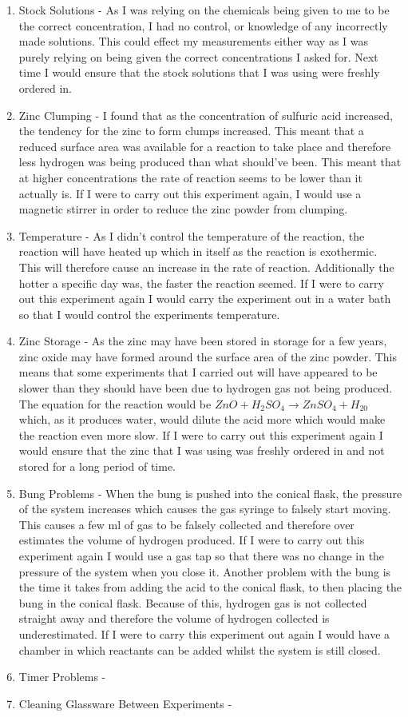 \begin{enumerate}
\item Stock Solutions - As I was relying on the chemicals being given to me to be the correct concentration, I had no control, or knowledge of any incorrectly made solutions. This could effect my measurements either way as I was purely relying on being given the correct concentrations I asked for. Next time I would ensure that the stock solutions that I was using were freshly ordered in.

\item Zinc Clumping - I found that as the concentration of sulfuric acid increased, the tendency for the zinc to form clumps increased. This meant that a reduced surface area was available for a reaction to take place and therefore less hydrogen was being produced than what should've been. This meant that at higher concentrations the rate of reaction seems to be lower than it actually is. If I were to carry out this experiment again, I would use a magnetic stirrer in order to reduce the zinc powder from clumping.

\item Temperature - As I didn't control the temperature of the reaction, the reaction will have heated up which in itself as the reaction is exothermic. This will therefore cause an increase in the rate of reaction. Additionally the hotter a specific day was, the faster the reaction seemed. If I were to carry out this experiment again I would carry the experiment out in a water bath so that I would control the experiments temperature.

\item Zinc Storage - As the zinc may have been stored in storage for a few years, zinc oxide may have formed around the surface area of the zinc powder. This means that some experiments that I carried out will have appeared to be slower than they should have been due to hydrogen gas not being produced. The equation for the reaction would be $ZnO + H_2SO_4 \rightarrow ZnSO_4 + H_20$ which, as it produces water, would dilute the acid more which would make the reaction even more slow. If I were to carry out this experiment again I would ensure that the zinc that I was using was freshly ordered in and not stored for a long period of time.

\item Bung Problems - When the bung is pushed into the conical flask, the pressure of the system increases which causes the gas syringe to falsely start moving. This causes a few ml of gas to be falsely collected and therefore over estimates the volume of hydrogen produced. If I were to carry out this experiment again I would use a gas tap so that there was no change in the pressure of the system when you close it. Another problem with the bung is the time it takes from adding the acid to the conical flask, to then placing the bung in the conical flask. Because of this, hydrogen gas is not collected straight away and therefore the volume of hydrogen collected is underestimated. If I were to carry this experiment out again I would have a chamber in which reactants can be added whilst the system is still closed.

\item Timer Problems -

\item Cleaning Glassware Between Experiments - 
\end{enumerate}